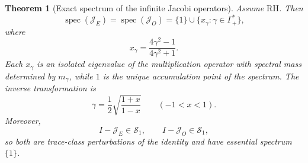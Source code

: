\documentclass[preprint,12pt]{elsarticle}
\numberwithin{equation}{section}
\theoremstyle{plain}
\newtheorem{theorem}{Theorem}[section]
\theoremstyle{definition}
\theoremstyle{remark}
\newcommand{\RH}{\mathrm{RH}}
\newcommand{\spec}{\operatorname{spec}}
\begin{document}
\begin{theorem}[Exact spectrum of the infinite Jacobi operators]
\label{thm:jacobi_zero_support}
Assume $\RH$. Then
\begin{equation}
\spec(\mathcal J_E)=\spec(\mathcal J_O)
=\{1\}\cup\{x_\gamma:\gamma\in\Gamma_+^*\},
\label{eq:jacobi_support}
\end{equation}
where
\begin{equation}
x_\gamma=\frac{4\gamma^2-1}{4\gamma^2+1}.
\label{eq:jacobi_xgamma_repeat}
\end{equation}
Each $x_\gamma$ is an isolated eigenvalue of the multiplication operator with spectral mass determined by $m_\gamma$, while $1$ is the unique accumulation point of the spectrum. The inverse transformation is
\begin{equation}
\gamma=\frac12\sqrt{\frac{1+x}{1-x}}
\qquad(-1<x<1).
\label{eq:gamma_from_x}
\end{equation}
Moreover,
\begin{equation}
I-\mathcal J_E\in\mathcal S_1,
\qquad
I-\mathcal J_O\in\mathcal S_1,
\label{eq:Jacobi_trace_class}
\end{equation}
so both are trace-class perturbations of the identity and have essential spectrum $\{1\}$.
\end{theorem}
\end{document}

